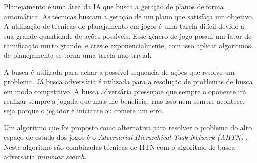 Planejamento é uma área da IA que busca a geração de planos de forma automática. As técnicas buscam a geração de um plano que satisfaça um objetivo. 
A utilização de técnicas de planejamento em jogos é uma tarefa difícil devido a sua grande quantidade de ações possíveis. 
Esse gênero de jogo possui um fator de ramificação muito grande, e cresce exponencialmente, com isso aplicar algoritmos de planejamento se torna uma tarefa não trivial. 

%
%
A busca é utilizada para achar a possível sequencia de ações que resolve um problema. Já busca adversária é utilizada para a resolução de problemas de busca em modo competitivo. 
A busca adversária pressupõe que sempre o oponente irá realizar sempre a jogada que mais lhe beneficia, mas isso nem sempre acontece, seja porque o jogador é iniciante ou comete um erro. 


Um algoritmo que foi proposto como alternativa para resolver o problema do alto espaço de estado dos jogos é o \textit{Adversarial Hierarchical Task Network (AHTN)} \cite{ontanon2015adversarial}. 
Neste algoritmo são combinadas técnicas de HTN com o algoritmo de busca adversaria \textit{minimax search}. 

